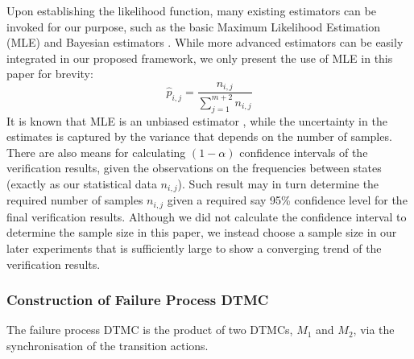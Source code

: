 Upon establishing the likelihood function, many existing estimators can be invoked for our purpose, such as the basic Maximum Likelihood Estimation (MLE) and Bayesian estimators \cite{epifani_model_2009}. While more advanced estimators can be easily integrated in our proposed framework, we only present the use of MLE in this paper for brevity:
\begin{equation}
\label{eq_mle_tranprob}
    \hat{p}_{i,j}=\frac{n_{i,j}}{\sum_{j=1}^{m+2} n_{i,j}}
\end{equation}
It is known that MLE is an unbiased estimator 
\cite{epifani_model_2009}, while the uncertainty in the estimates is captured by the variance that depends on the number of samples. There are also means for calculating $(1-\alpha)$ confidence intervals of the verification results, given the observations on the frequencies between states (exactly as our statistical data $n_{i,j}$). Such result may in turn determine the required number of samples $n_{i,j}$ given a required say 95\% confidence level for the final verification results. Although we did not calculate the confidence interval to determine the sample size in this paper, we instead choose a sample size in our later experiments that is sufficiently large to show a converging trend of the verification results.

\subsubsection{Construction of Failure Process DTMC}
\label{sec_formalise_DTMC}

The failure process DTMC is the product of two DTMCs, $M_1$ and $M_2$, via the synchronisation of the transition actions.

